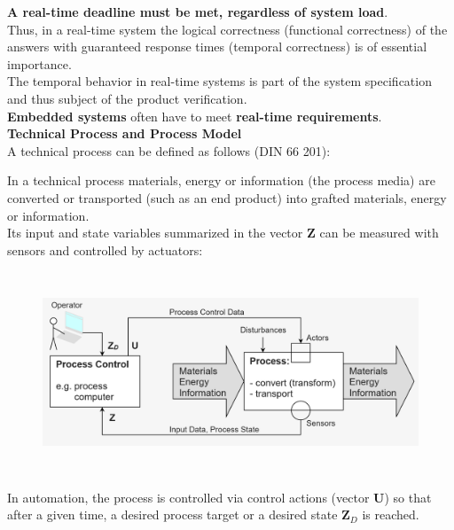 \textbf{A real-time deadline must be met, regardless of system load}.\\

Thus, in a real-time system the logical correctness (functional correctness) of the answers with guaranteed response times (temporal correctness) is of essential importance. \\

The temporal behavior in real-time systems is part of the system specification and thus subject of the product verification.\\

\textbf{Embedded systems} often have to meet \textbf{real-time requirements}.\\

{\rot\bf Technical Process and Process Model}\\

A technical process can be defined as follows (DIN 66 201):

In a technical process materials, energy or information (the process media) are converted or transported (such as an end product) into grafted materials, energy or information. \\

Its input and state variables summarized in the vector \textbf{Z} can be measured with sensors and controlled by actuators: \\

\begin{figure}[h]
    \centering
    \includegraphics[width=14cm, height=6cm]{Images/image60.png}
    \label{fig:Fig 3}
\end{figure}

In automation, the process is controlled via control actions (vector \textbf{U}) so that after a given time, a desired process target or a desired state \textbf{Z\textit{${}_{D}$}} is reached. \\

